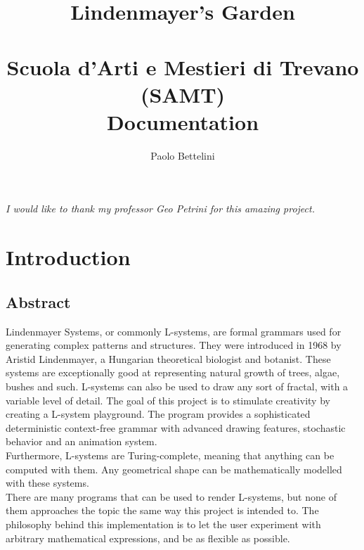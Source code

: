 \documentclass[a4paper]{article}
\title{%
    Lindenmayer's Garden \\
    \phantom{} \\
    \Large Scuola d'Arti e Mestieri di Trevano (SAMT) \\
    \Large Documentation
}
\author{Paolo Bettelini}
\date{}
\begin{document}
\maketitle


\vspace{4.5cm}

\begin{center}
\end{center}

\pagebreak

\begin{center}
    \thispagestyle{empty}
    \vspace*{\fill}
    \textsl{I would like to thank my professor Geo Petrini for this amazing project.}
    \vspace*{\fill}
\end{center}

\pagebreak

\tableofcontents

\pagebreak

\section{Introduction}

\subsection{Abstract}

Lindenmayer Systems, or commonly L-systems,
are formal grammars used for generating complex patterns and structures.
They were introduced in 1968 by Aristid Lindenmayer, a Hungarian theoretical biologist and botanist.
These systems are exceptionally good at representing natural growth of trees, algae, bushes and such.
L-systems can also be used to draw any sort of fractal, with a variable level of detail.
The goal of this project is to stimulate creativity
by creating a L-system playground.
The program provides a sophisticated deterministic context-free grammar
with advanced drawing features, stochastic behavior and an animation system. \\
Furthermore, L-systems are Turing-complete, meaning that anything can be computed
with them.
Any geometrical shape can be mathematically modelled with these systems. \\
There are many programs that can be used to render L-systems, but none of them
approaches the topic the same way this project is intended to.
The philosophy behind this implementation is to let the user experiment
with arbitrary mathematical expressions, and be as flexible as possible.
\end{document}
